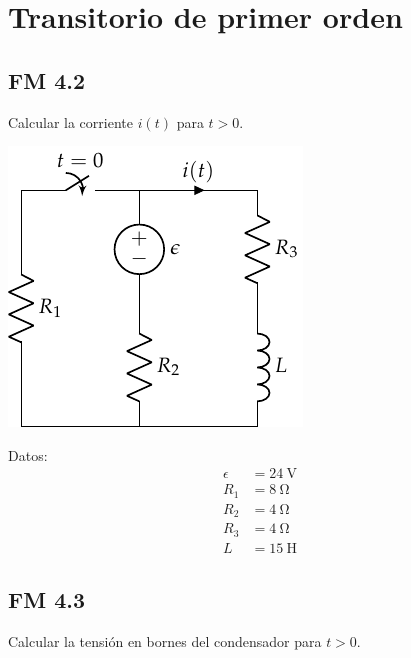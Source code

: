 \documentclass[12pt]{article}
\begin{document}
\title{}

\date{2019-20}


\section{Transitorio de primer orden}

\subsection{FM 4.2}

Calcular la corriente $i(t)$ para $t > 0$. 

\begin{minipage}{0.5\textwidth}
\includegraphics{figs/FM_4_2}
\end{minipage}
\hfill
\begin{minipage}{0.5\textwidth}
Datos:
\begin{align*}
  \epsilon &= \SI{24}{\volt}\\
  R_1 &= \SI{8}{\ohm}\\
  R_2 &= \SI{4}{\ohm}\\
  R_3 &= \SI{4}{\ohm}\\
  L &= \SI{15}{\henry}
\end{align*}
\end{minipage}

\subsection{FM 4.3}

Calcular la tensión en bornes del condensador para $t > 0$.
\end{document}
